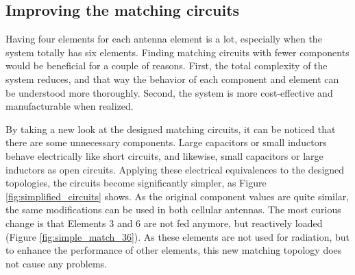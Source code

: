\subsection{Improving the matching circuits}
\label{sec:matching_circuit}

Having four elements for each antenna element is a lot, especially when the system totally has six elements. Finding matching circuits with fewer components would be beneficial for a couple of reasons. First, the total complexity of the system reduces, and that way the behavior of each component and element can be understood more thoroughly. Second, the system is more cost-effective and manufacturable when realized. 

By taking a new look at the designed matching circuits, it can be noticed that there are some unnecessary components. Large capacitors or small inductors behave electrically like short circuits, and likewise, small capacitors or large inductors as open circuits. Applying these electrical equivalences to the designed topologies, the circuits become significantly simpler, as Figure \ref{fig:simplified_circuits} shows. As the original component values are quite similar, the same modifications can be used in both cellular antennas. The most curious change is that Elements 3 and 6 are not fed anymore, but reactively loaded (Figure \ref{fig:simple_match_36}). As these elements are not used for radiation, but to enhance the performance of other elements, this new matching topology does not cause any problems. 

